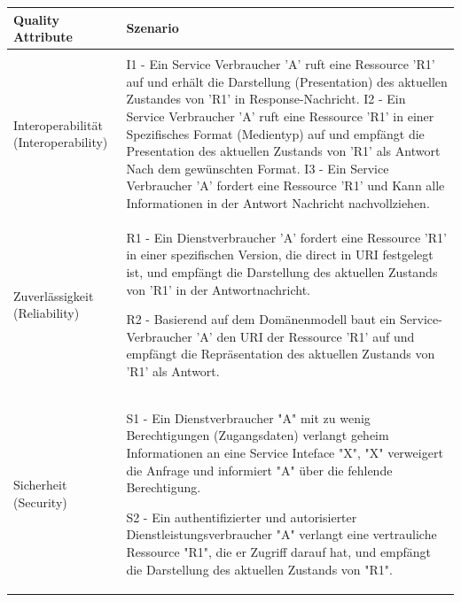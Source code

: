 \documentclass{acmsiggraph}
\begin{document}
\begin{center}
  \label{tab:xtab}
  \begin{xtabular}{|C{2cm}|L{5,5cm}|} 
  \hline
    Quality Attribute & Szenario \\
    \hline
   & \\ 
    Interoperabilität (Interoperability) & I1 - Ein  Service Verbraucher 'A' ruft eine Ressource 'R1' auf und
erhält die Darstellung (Presentation) des aktuellen Zustandes von 'R1' in Response-Nachricht.
I2 - Ein Service Verbraucher 'A' ruft eine Ressource 'R1' in einer
Spezifisches Format (Medientyp) auf und empfängt die
Presentation des aktuellen Zustands von 'R1' als Antwort
Nach dem gewünschten Format.
I3 - Ein Service Verbraucher 'A' fordert eine Ressource 'R1' und
Kann alle Informationen in der Antwort Nachricht nachvollziehen.
 \\ 
    \hline
    Zuverlässigkeit (Reliability) & R1 - Ein Dienstverbraucher 'A' fordert eine Ressource 'R1' in einer spezifischen Version, die direct  in URI festgelegt ist, und empfängt die Darstellung des aktuellen Zustands von 'R1' in der Antwortnachricht.

R2 - Basierend auf dem Domänenmodell baut ein Service-Verbraucher 'A' den URI der Ressource 'R1' auf und empfängt die Repräsentation des aktuellen Zustands von 'R1' als Antwort.
 \\ 
    \hline
     Sicherheit  (Security) & 
     S1 - Ein Dienstverbraucher "A" mit zu wenig Berechtigungen (Zugangsdaten) verlangt geheim Informationen an eine Service Inteface "X", "X" verweigert die Anfrage und informiert "A" über die fehlende Berechtigung.

S2 - Ein authentifizierter und autorisierter Dienstleistungsverbraucher "A" verlangt eine vertrauliche Ressource "R1", die er Zugriff darauf hat, und empfängt die Darstellung des aktuellen Zustands von "R1".


\end{xtabular}
\end{center}
\end{document}
